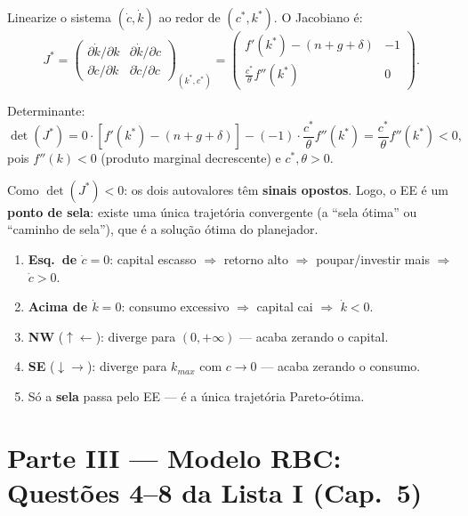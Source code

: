 \documentclass[12pt, a4paper]{article}
\begin{document}
Linearize o sistema $(\dot{c},\dot{k})$ ao redor de $(c^*, k^*)$. O Jacobiano é:
\[
J^* = \begin{pmatrix} \partial\dot{k}/\partial k & \partial\dot{k}/\partial c \\ \partial\dot{c}/\partial k & \partial\dot{c}/\partial c \end{pmatrix}_{(k^*,c^*)} = \begin{pmatrix} f'(k^*)-(n+g+\delta) & -1 \\ \frac{c^*}{\theta}f''(k^*) & 0 \end{pmatrix}.
\]

Determinante:
\[
\det(J^*) = 0\cdot\!\left[f'(k^*)-(n+g+\delta)\right] - (-1)\cdot\frac{c^*}{\theta}f''(k^*) = \frac{c^*}{\theta}f''(k^*) < 0,
\]
pois $f''(k) < 0$ (produto marginal decrescente) e $c^*, \theta > 0$.

Como $\det(J^*) < 0$: os dois autovalores têm \textbf{sinais opostos}. Logo, o EE é um \textbf{ponto de sela}: existe uma única trajetória convergente (a ``sela ótima'' ou ``caminho de sela''), que é a solução ótima do planejador.

\begin{provabox}[title={Diagrama de Fases --- Regras Mnemônicas}]
\begin{enumerate}
\item \textbf{Esq.\ de $\dot{c}=0$}: capital escasso $\Rightarrow$ retorno alto $\Rightarrow$ poupar/investir mais $\Rightarrow$ $\dot{c}>0$.
\item \textbf{Acima de $\dot{k}=0$}: consumo excessivo $\Rightarrow$ capital cai $\Rightarrow$ $\dot{k}<0$.
\item \textbf{NW} ($\uparrow\leftarrow$): diverge para $(0,+\infty)$ --- acaba zerando o capital.
\item \textbf{SE} ($\downarrow\rightarrow$): diverge para $k_{max}$ com $c\to 0$ --- acaba zerando o consumo.
\item Só a \textbf{sela} passa pelo EE --- é a única trajetória Pareto-ótima.
\end{enumerate}
\end{provabox}

\section*{Parte III --- Modelo RBC: Questões 4--8 da Lista I (Cap.\ 5)}
\end{document}

